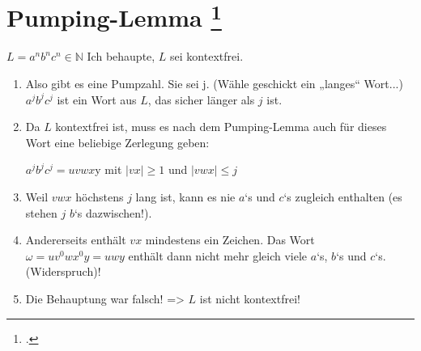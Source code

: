 \documentclass{lehramt-informatik-aufgabe}
\begin{document}
\section{Pumping-Lemma
\footcite[Seite 42]{theo:fs:2}}

$L = a^n b^n c^n \in \mathbb{N}$
Ich behaupte, $L$ sei kontextfrei.

\begin{enumerate}
\item Also gibt es eine Pumpzahl. Sie sei j.
(Wähle geschickt ein „langes“ Wort...)
$a^j b^j c^j$ ist ein Wort aus $L$, das sicher länger als $j$ ist.

\item  Da $L$ kontextfrei ist, muss es nach dem Pumping-Lemma auch für
dieses Wort eine beliebige Zerlegung geben:

$a^j b^j c^j = uvwx$y mit $|vx| \geq 1$ und $|vwx| \leq j$

\item  Weil $vwx$ höchstens $j$ lang ist, kann es nie $a$‘s und $c$‘s
zugleich enthalten (es stehen $j$ $b$‘s dazwischen!).

\item Andererseits enthält $vx$ mindestens ein Zeichen. Das Wort $\omega
= uv^0 wx^0 y = uwy$ enthält dann nicht mehr gleich viele $a$‘s, $b$‘s
und $c$‘s. (Widerspruch)!

\item Die Behauptung war falsch! => $L$ ist nicht kontextfrei!

\end{enumerate}
\end{document}
